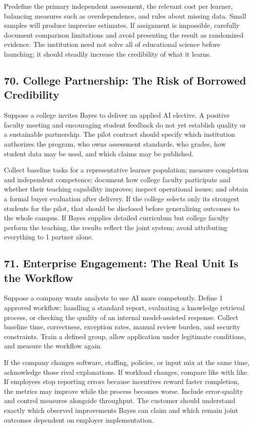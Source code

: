Predefine the primary independent assessment, the relevant cost per learner, balancing measures such as overdependence, and rules about missing data. Small samples will produce imprecise estimates. If assignment is impossible, carefully document comparison limitations and avoid presenting the result as randomized evidence. The institution need not solve all of educational science before launching; it should steadily increase the credibility of what it learns.

\subsection*{70. College Partnership: The Risk of Borrowed Credibility}

Suppose a college invites Bayes to deliver an applied AI elective. A positive faculty meeting and encouraging student feedback do not yet establish quality or a sustainable partnership. The pilot contract should specify which institution authorizes the program, who owns assessment standards, who grades, how student data may be used, and which claims may be published.

Collect baseline tasks for a representative learner population; measure completion and independent competence; document how college faculty participate and whether their teaching capability improves; inspect operational issues; and obtain a formal buyer evaluation after delivery. If the college selects only its strongest students for the pilot, that should be disclosed before generalizing outcomes to the whole campus. If Bayes supplies detailed curriculum but college faculty perform the teaching, the results reflect the joint system; avoid attributing everything to 1 partner alone.

\subsection*{71. Enterprise Engagement: The Real Unit Is the Workflow}

Suppose a company wants analysts to use AI more competently. Define 1 approved workflow: handling a standard report, evaluating a knowledge retrieval process, or checking the quality of an internal model-assisted response. Collect baseline time, correctness, exception rates, manual review burden, and security constraints. Train a defined group, allow application under legitimate conditions, and measure the workflow again.

If the company changes software, staffing, policies, or input mix at the same time, acknowledge those rival explanations. If workload changes, compare like with like. If employees stop reporting errors because incentives reward faster completion, the metrics may improve while the process becomes worse. Include error-quality and control measures alongside throughput. The customer should understand exactly which observed improvements Bayes can claim and which remain joint outcomes dependent on employer implementation.

